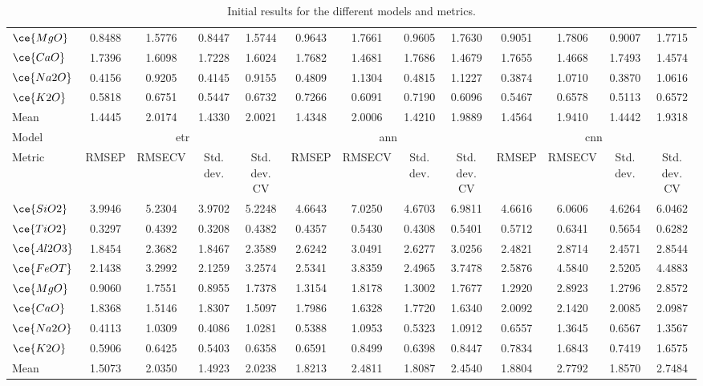 \begin{table*}[]
{\begin{tabular}{l|cccc|cccc|cccc}
$\ce{MgO}$ & 0.8488 & 1.5776 & 0.8447 & 1.5744 & 0.9643 & 1.7661 & 0.9605 & 1.7630 & 0.9051 & 1.7806 & 0.9007 & 1.7715 \\
$\ce{CaO}$ & 1.7396 & 1.6098 & 1.7228 & 1.6024 & 1.7682 & 1.4681 & 1.7686 & 1.4679 & 1.7655 & 1.4668 & 1.7493 & 1.4574 \\
$\ce{Na2O}$ & 0.4156 & 0.9205 & 0.4145 & 0.9155 & 0.4809 & 1.1304 & 0.4815 & 1.1227 & 0.3874 & 1.0710 & 0.3870 & 1.0616 \\
$\ce{K2O}$ & 0.5818 & 0.6751 & 0.5447 & 0.6732 & 0.7266 & 0.6091 & 0.7190 & 0.6096 & 0.5467 & 0.6578 & 0.5113 & 0.6572 \\
\hline
Mean & 1.4445 & 2.0174 & 1.4330 & 2.0021 & 1.4348 & 2.0006 & 1.4210 & 1.9889 & 1.4564 & 1.9410 & 1.4442 & 1.9318 \\
\hline
Model & \multicolumn{4}{c}{\gls{etr}} & \multicolumn{4}{c}{\gls{ann}} & \multicolumn{4}{c}{\gls{cnn}} \\
Metric & \multicolumn{1}{c}{RMSEP} & \multicolumn{1}{c}{RMSECV} & \multicolumn{1}{c}{Std. dev.} & \multicolumn{1}{c}{Std. dev. CV} & \multicolumn{1}{c}{RMSEP} & \multicolumn{1}{c}{RMSECV} & \multicolumn{1}{c}{Std. dev.} & \multicolumn{1}{c}{Std. dev. CV} & \multicolumn{1}{c}{RMSEP} & \multicolumn{1}{c}{RMSECV} & \multicolumn{1}{c}{Std. dev.} & \multicolumn{1}{c}{Std. dev. CV} \\
\hline
$\ce{SiO2}$ & 3.9946 & 5.2304 & 3.9702 & 5.2248 & 4.6643 & 7.0250 & 4.6703 & 6.9811 & 4.6616 & 6.0606 & 4.6264 & 6.0462 \\
$\ce{TiO2}$ & 0.3297 & 0.4392 & 0.3208 & 0.4382 & 0.4357 & 0.5430 & 0.4308 & 0.5401 & 0.5712 & 0.6341 & 0.5654 & 0.6282 \\
$\ce{Al2O3}$ & 1.8454 & 2.3682 & 1.8467 & 2.3589 & 2.6242 & 3.0491 & 2.6277 & 3.0256 & 2.4821 & 2.8714 & 2.4571 & 2.8544 \\
$\ce{FeOT}$ & 2.1438 & 3.2992 & 2.1259 & 3.2574 & 2.5341 & 3.8359 & 2.4965 & 3.7478 & 2.5876 & 4.5840 & 2.5205 & 4.4883 \\
$\ce{MgO}$ & 0.9060 & 1.7551 & 0.8955 & 1.7378 & 1.3154 & 1.8178 & 1.3002 & 1.7677 & 1.2920 & 2.8923 & 1.2796 & 2.8572 \\
$\ce{CaO}$ & 1.8368 & 1.5146 & 1.8307 & 1.5097 & 1.7986 & 1.6328 & 1.7720 & 1.6340 & 2.0092 & 2.1420 & 2.0085 & 2.0987 \\
$\ce{Na2O}$ & 0.4113 & 1.0309 & 0.4086 & 1.0281 & 0.5388 & 1.0953 & 0.5323 & 1.0912 & 0.6557 & 1.3645 & 0.6567 & 1.3567 \\
$\ce{K2O}$ & 0.5906 & 0.6425 & 0.5403 & 0.6358 & 0.6591 & 0.8499 & 0.6398 & 0.8447 & 0.7834 & 1.6843 & 0.7419 & 1.6575 \\
\hline
Mean & 1.5073 & 2.0350 & 1.4923 & 2.0238 & 1.8213 & 2.4811 & 1.8087 & 2.4540 & 1.8804 & 2.7792 & 1.8570 & 2.7484 \\
\hline
\end{tabular}%
}
\caption{Initial results for the different models and metrics.}
\end{table*}
